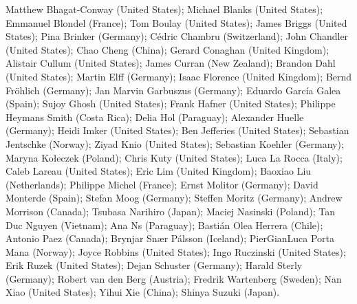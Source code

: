 Matthew Bhagat-Conway (United States);
Michael Blanks (United States);
Emmanuel Blondel (France);
Tom Boulay (United States);
James Briggs (United States);
Pina Brinker (Germany);
Cédric Chambru (Switzerland);
John Chandler (United States);
Chao Cheng (China);
Gerard Conaghan (United Kingdom);
Alistair Cullum (United States);
James Curran (New Zealand);
Brandon Dahl (United States);
Martin Elff (Germany);
Isaac Florence (United Kingdom);
Bernd Fröhlich (Germany);
Jan Marvin Garbuszus (Germany);
Eduardo García Galea (Spain);
Sujoy Ghosh (United States);
Frank Hafner (United States);
Philippe Heymans Smith (Costa Rica);
Delia Hol (Paraguay);
Alexander Huelle (Germany);
Heidi Imker (United States);
Ben Jefferies (United States);
Sebastian Jentschke (Norway);
Ziyad Knio (United States);
Sebastian Koehler (Germany);
Maryna Kołeczek (Poland);
Chris Kuty (United States);
Luca La Rocca (Italy);
Caleb Lareau (United States);
Eric Lim (United Kingdom);
Baoxiao Liu (Netherlands);
Philippe Michel (France);
Ernst Molitor (Germany);
David Monterde (Spain);
Stefan Moog (Germany);
Steffen Moritz (Germany);
Andrew Morrison (Canada);
Tsubasa Narihiro (Japan);
Maciej Nasinski (Poland);
Tan Duc Nguyen (Vietnam);
Ana Ns (Paraguay);
Bastián Olea Herrera (Chile);
Antonio Paez (Canada);
Brynjar Snær Pálsson (Iceland);
PierGianLuca Porta Mana (Norway);
Joyce Robbins (United States);
Ingo Ruczinski (United States);
Erik Ruzek (United States);
Dejan Schuster (Germany);
Harald Sterly (Germany);
Robert van den Berg (Austria);
Fredrik Wartenberg (Sweden);
Nan Xiao (United States);
Yihui Xie (China);
Shinya Suzuki (Japan).


\address{%
Torsten Hothorn\\
Universität Zürich\\%
Switzerland\\
%
%
\textit{ORCiD: \href{https://orcid.org/0000-0001-8301-0471}{0000-0001-8301-0471}}\\%
\href{mailto:Torsten.Hothorn@R-project.org}{\nolinkurl{Torsten.Hothorn@R-project.org}}%
}
